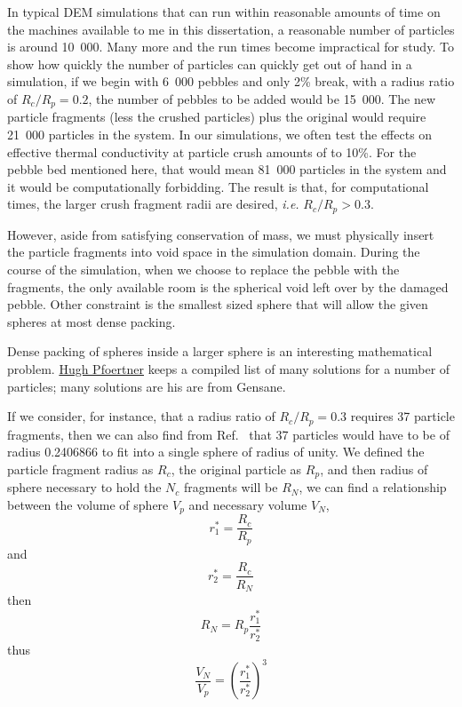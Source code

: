 In typical DEM simulations that can run within reasonable amounts of time on the machines available to me in this dissertation, a reasonable number of particles is around 10~000. Many more and the run times become impractical for study. To show how quickly the number of particles can quickly get out of hand in a simulation, if we begin with 6~000 pebbles and only 2\% break, with a radius ratio of $R_c/R_p = 0.2$, the number of pebbles to be added would be 15~000. The new particle fragments (less the crushed particles) plus the original would require 21~000 particles in the system. In our simulations, we often test the effects on effective thermal conductivity at particle crush amounts of to 10\%. For the pebble bed mentioned here, that would mean 81~000 particles in the system and it would be computationally forbidding. The result is that, for computational times, the larger crush fragment radii are desired, \textit{i.e.} $R_c/R_p > 0.3$.

However, aside from satisfying conservation of mass, we must physically insert the particle fragments into void space in the simulation domain. During the course of the simulation, when we choose to replace the pebble with the fragments, the only available room is the spherical void left over by the damaged pebble. Other constraint is the smallest sized sphere that will allow the given spheres at most dense packing. 

Dense packing of spheres inside a larger sphere is an interesting mathematical problem. \href{http://www.randomwalk.de/sphere/insphr/spisbest.txt}{Hugh Pfoertner} keeps a compiled list of many solutions for a number of particles; many solutions are his are from Gensane.\cite{gensane2003dense}

If we consider, for instance, that a radius ratio of $R_c/R_p = 0.3$ requires 37 particle fragments, then we can also find from Ref.~\cite{gensane2003dense} that 37 particles would have to be of radius 0.2406866 to fit into a single sphere of radius of unity. We defined the particle fragment radius as $R_c$, the original particle as $R_p$, and then radius of sphere necessary to hold the $N_c$ fragments will be $R_N$, we can find a relationship between the volume of sphere $V_p$ and necessary volume $V_N$,
\begin{equation}
	r_1^* = \frac{R_c}{R_p}
\end{equation}
and
\begin{equation}
	r_2^* = \frac{R_c}{R_N}
\end{equation}
then 
\begin{equation}
	R_N = R_p \frac{r_1^*}{r_2^*}
\end{equation}
thus
\begin{equation}
	\frac{V_N}{V_p} = \left(\frac{r_1^*}{r_2^*}\right)^3
\end{equation}

